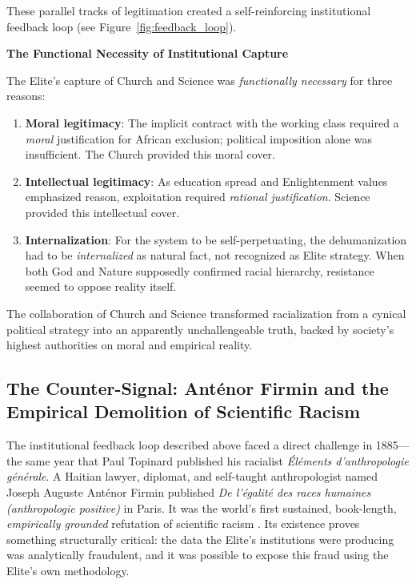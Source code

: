 These parallel tracks of legitimation created a self-reinforcing institutional feedback loop (see Figure~\ref{fig:feedback_loop}).

\textbf{The Functional Necessity of Institutional Capture}

The Elite's capture of Church and Science was \textit{functionally necessary} for three reasons:

\begin{enumerate}
    \item \textbf{Moral legitimacy}: The implicit contract with the working class required a \textit{moral} justification for African exclusion; political imposition alone was insufficient. The Church provided this moral cover.
    
    \item \textbf{Intellectual legitimacy}: As education spread and Enlightenment values emphasized reason, exploitation required \textit{rational justification}. Science provided this intellectual cover.
    
    \item \textbf{Internalization}: For the system to be self-perpetuating, the dehumanization had to be \textit{internalized} as natural fact, not recognized as Elite strategy. When both God and Nature supposedly confirmed racial hierarchy, resistance seemed to oppose reality itself.
\end{enumerate}

The collaboration of Church and Science transformed racialization from a cynical political strategy into an apparently unchallengeable truth, backed by society's highest authorities on moral and empirical reality.

\subsection{The Counter-Signal: Anténor Firmin and the Empirical Demolition of Scientific Racism}
\label{sec:firmin_counter_signal}

The institutional feedback loop described above faced a direct challenge in 1885---the same year that Paul Topinard published his racialist \textit{Éléments d'anthropologie générale}. A Haitian lawyer, diplomat, and self-taught anthropologist named Joseph Auguste Anténor Firmin published \textit{De l'égalité des races humaines (anthropologie positive)} in Paris. It was the world's first sustained, book-length, \textit{empirically grounded} refutation of scientific racism \cite{firmin_legacy}. Its existence proves something structurally critical: the data the Elite's institutions were producing was analytically fraudulent, and it was possible to expose this fraud using the Elite's own methodology.

